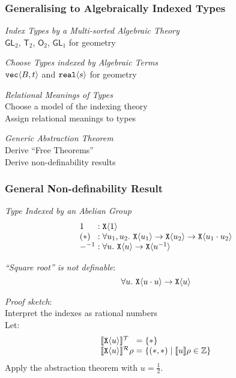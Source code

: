 \documentclass[xetex,serif,mathserif]{beamer}
\newcommand{\sepbar}{\mathrel|}
\newcommand{\SynGL}[1]{\mathsf{GL}_#1}
\newcommand{\SynOrth}[1]{\mathsf{O}_#1}
\newcommand{\SynTransl}[1]{\mathsf{T}_#1}
\newcommand{\tyPrim}[2]{\textup{\texttt{#1}}\langle #2 \rangle}
\newcommand{\sem}[1]{\llbracket #1 \rrbracket}
\newcommand{\tySem}[1]{\llbracket #1 \rrbracket^{\mathcal{T}}}
\newcommand{\rsem}[3]{\llbracket #1 \rrbracket^{\mathcal{R}}_{#2}{#3}}
\newenvironment{slide}[1]{\begin{frame}\frametitle{#1}}{\end{frame}}
\begin{document}
\begin{slide}{Generalising to Algebraically Indexed Types}
  \textcolor{titlered}{\emph{Index Types by a Multi-sorted Algebraic Theory}} \\
  \quad $\SynGL{2}$, $\SynTransl{2}$, $\SynOrth{2}$, $\SynGL{1}$ for geometry

  \bigskip

  \textcolor{titlered}{\emph{Choose Types indexed by Algebraic Terms}} \\
  \quad $\tyPrim{vec}{B,t}$ and $\tyPrim{real}{s}$ for geometry

  \bigskip

  \textcolor{titlered}{\emph{Relational Meanings of Types}} \\
  \quad Choose a model of the indexing theory \\
  \quad Assign relational meanings to types

  \bigskip

  \textcolor{titlered}{\emph{Generic Abstraction Theorem}} \\
  \quad Derive ``Free Theorems'' \\
  \quad Derive non-definability results

\end{slide}

\begin{slide}{General Non-definability Result}
  \textcolor{titlered}{\emph{Type Indexed by an Abelian Group}}
  \begin{displaymath}
    \begin{array}{l@{\hspace{0.3em}}l}
      1 & : \tyPrim{X}{1} \\
      (*) & : \forall u_1,u_2.~\tyPrim{X}{u_1} \to \tyPrim{X}{u_2} \to \tyPrim{X}{u_1 \cdot u_2} \\
      -^{-1} & : \forall u.~\tyPrim{X}{u} \to \tyPrim{X}{u^{-1}}
    \end{array}
  \end{displaymath}

  \textcolor{titlered}{\emph{``Square root'' is not definable}}:
  \begin{displaymath}
    \forall u.~\tyPrim{X}{u \cdot u} \to \tyPrim{X}{u}
  \end{displaymath}

  \textcolor{titlered}{\emph{Proof sketch}}: \\
  \quad Interpret the indexes as rational numbers \\
  \quad Let:
  \begin{displaymath}
    \begin{array}{l@{\hspace{0.3em}}l}
      \tySem{\tyPrim{X}{u}} & = \{ * \} \\
      \rsem{\tyPrim{X}{u}}{}\rho & = \{ (*,*) \sepbar \sem{u}\rho \in \mathbb{Z} \}
    \end{array}
  \end{displaymath}
  \quad Apply the abstraction theorem with
  $u = \frac{1}{2}$.
\end{slide}
\end{document}
